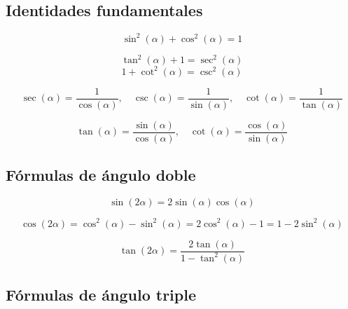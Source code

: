 
\subsection{Identidades fundamentales}

\begin{proposición}
$$\sin^2(\alpha) + \cos^2(\alpha) = 1$$
\end{proposición}

\begin{proposición}
$$\tan^2(\alpha) + 1 = \sec^2(\alpha)$$
$$1 + \cot^2(\alpha) = \csc^2(\alpha)$$
\end{proposición}

\begin{proposición}
$$\sec(\alpha) = \frac{1}{\cos(\alpha)}, \quad \csc(\alpha) = \frac{1}{\sin(\alpha)}, \quad \cot(\alpha) = \frac{1}{\tan(\alpha)}$$
\end{proposición}

\begin{proposición}
$$\tan(\alpha) = \frac{\sin(\alpha)}{\cos(\alpha)}, \quad \cot(\alpha) = \frac{\cos(\alpha)}{\sin(\alpha)}$$
\end{proposición}

\subsection{Fórmulas de ángulo doble}

\begin{proposición}
$$\sin(2\alpha) = 2\sin(\alpha)\cos(\alpha)$$
\end{proposición}

\begin{proposición}
$$\cos(2\alpha) = \cos^2(\alpha) - \sin^2(\alpha) = 2\cos^2(\alpha) - 1 = 1 - 2\sin^2(\alpha)$$
\end{proposición}

\begin{proposición}
$$\tan(2\alpha) = \frac{2\tan(\alpha)}{1 - \tan^2(\alpha)}$$
\end{proposición}

\subsection{Fórmulas de ángulo triple}

